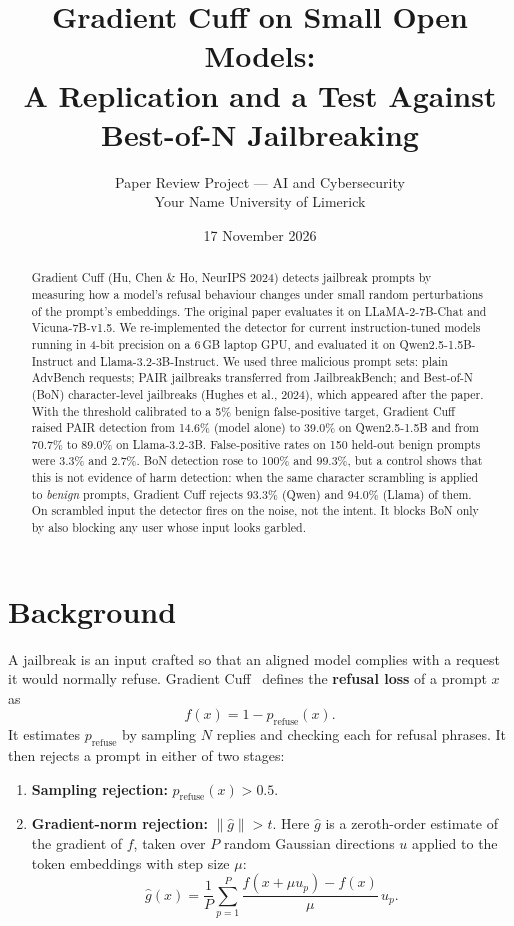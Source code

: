 \documentclass[11pt,a4paper]{article}
\title{Gradient Cuff on Small Open Models:\\
\large A Replication and a Test Against Best-of-N Jailbreaking}
\author{Paper Review Project --- AI and Cybersecurity\\
\small Your Name \quad\textperiodcentered\quad University of Limerick}
\date{17 November 2026}
\newcommand{\gnorm}{\lVert\hat{g}\rVert}
\begin{document}
\maketitle

\begin{abstract}
Gradient Cuff (Hu, Chen \& Ho, NeurIPS 2024) detects jailbreak prompts by measuring how a model's refusal behaviour changes under small random perturbations of the prompt's embeddings. The original paper evaluates it on LLaMA-2-7B-Chat and Vicuna-7B-v1.5. We re-implemented the detector for current instruction-tuned models running in 4-bit precision on a 6\,GB laptop GPU, and evaluated it on Qwen2.5-1.5B-Instruct and Llama-3.2-3B-Instruct. We used three malicious prompt sets: plain AdvBench requests; PAIR jailbreaks transferred from JailbreakBench; and Best-of-N (BoN) character-level jailbreaks (Hughes et al., 2024), which appeared after the paper. With the threshold calibrated to a 5\% benign false-positive target, Gradient Cuff raised PAIR detection from 14.6\% (model alone) to 39.0\% on Qwen2.5-1.5B and from 70.7\% to 89.0\% on Llama-3.2-3B. False-positive rates on 150 held-out benign prompts were 3.3\% and 2.7\%. BoN detection rose to 100\% and 99.3\%, but a control shows that this is not evidence of harm detection: when the same character scrambling is applied to \emph{benign} prompts, Gradient Cuff rejects 93.3\% (Qwen) and 94.0\% (Llama) of them. On scrambled input the detector fires on the noise, not the intent. It blocks BoN only by also blocking any user whose input looks garbled.
\end{abstract}

\section{Background}

A jailbreak is an input crafted so that an aligned model complies with a request it would normally refuse. Gradient Cuff~\cite{hu2024gradientcuff} defines the \textbf{refusal loss} of a prompt $x$ as
\begin{equation}
  f(x) = 1 - p_{\text{refuse}}(x).
\end{equation}
It estimates $p_{\text{refuse}}$ by sampling $N$ replies and checking each for refusal phrases. It then rejects a prompt in either of two stages:
\begin{enumerate}
  \item \textbf{Sampling rejection:} $p_{\text{refuse}}(x) > 0.5$.
  \item \textbf{Gradient-norm rejection:} $\gnorm > t$. Here $\hat{g}$ is a zeroth-order estimate of the gradient of $f$, taken over $P$ random Gaussian directions $u$ applied to the token embeddings with step size $\mu$:
  \begin{equation}
    \hat{g}(x) = \frac{1}{P}\sum_{p=1}^{P} \frac{f(x + \mu u_p) - f(x)}{\mu}\, u_p .
  \end{equation}
\end{enumerate}
\end{document}
